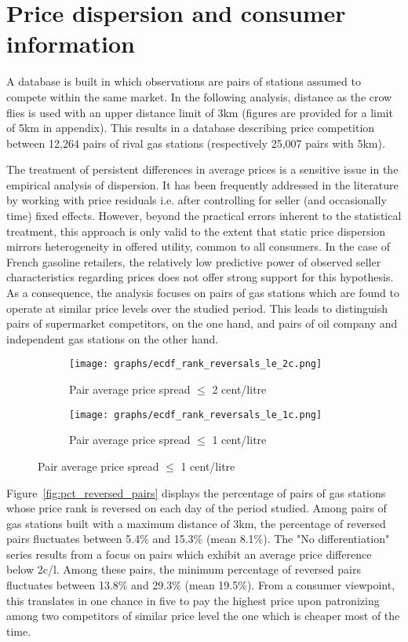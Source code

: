 \documentclass[english]{article}
\begin{document}
\section{Price dispersion and consumer information}

A database is built in which observations are pairs of stations assumed to compete within the same market. In the following analysis, distance as the crow flies is used with an upper distance limit of 3km (figures are provided for a limit of 5km in appendix). This results in a database describing price competition between 12,264 pairs of rival gas stations (respectively 25,007 pairs with 5km).

The treatment of persistent differences in average prices is a sensitive issue in the empirical analysis of dispersion. It has been frequently addressed in the literature by working with price residuals i.e. after controlling for seller (and occasionally time) fixed effects. However, beyond the practical errors inherent to the statistical treatment, this approach is only valid to the extent that static price dispersion mirrors heterogeneity in offered utility, common to all consumers. In the case of French gasoline retailers, the relatively low predictive power of observed seller characteristics regarding prices does not offer strong support for this hypothesis. As a consequence, the analysis focuses on pairs of gas stations which are found to operate at similar price levels over the studied period. This leads to distinguish pairs of supermarket competitors, on the one hand, and pairs of oil company and independent gas stations on the other hand.

\begin{figure}[H]
\centering
\caption{Empirical distribution functions of rank reversals (raw prices)}
\label{tab:ecdf_rr_distance}
\begin{subfigure}{.49\textwidth}
\centering
\texttt{[image: graphs/ecdf\_rank\_reversals\_le\_2c.png]}
\caption[short]{Pair average price spread $\le$ 2 cent/litre}
\end{subfigure}
\begin{subfigure}{.49\textwidth}
\centering
\texttt{[image: graphs/ecdf\_rank\_reversals\_le\_1c.png]}
\caption[short]{Pair average price spread $\le$ 1 cent/litre}
\end{subfigure}
\end{figure}

Figure~\ref{fig:pct_reversed_pairs} displays the percentage of pairs of gas stations whose price rank is reversed on each day of the period studied. Among pairs of gas stations built with a maximum distance of 3km, the percentage of reversed pairs fluctuates between 5.4\% and 15.3\%  (mean 8.1\%). The "No differentiation" series results from a focus on pairs which exhibit an average price difference below 2c/l. Among these pairs, the minimum percentage of reversed pairs fluctuates between 13.8\% and 29.3\% (mean 19.5\%). From a consumer viewpoint, this translates in one chance in five to pay the highest price upon patronizing among two competitors of similar price level the one which is cheaper most of the time.
\end{document}
